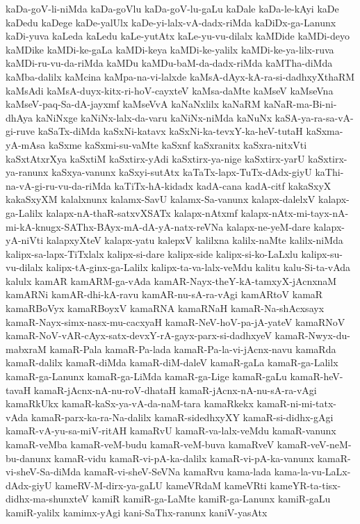 {kaDa-goV-li-niMda
kaDa-goVlu
kaDa-goV-lu-gaLu
kaDale
kaDa-le-kAyi
kaDe
kaDedu
kaDege
kaDe-yalUlx
kaDe-yi-lalx-vA-dadx-riMda
kaDiDx-ga-Lanunx
kaDi-yuva
kaLeda
kaLedu
kaLe-yutAtx
kaLe-yu-vu-dilalx
kaMDide
kaMDi-deyo
kaMDike
kaMDi-ke-gaLa
kaMDi-keya
kaMDi-ke-yalilx
kaMDi-ke-ya-lilx-ruva
kaMDi-ru-vu-da-riMda
kaMDu
kaMDu-baM-da-dadx-riMda
kaMTha-diMda
kaMba-dalilx
kaMcina
kaMpa-na-vi-lalxde
kaMsA-dAyx-kA-ra-si-dadhxyXthaRM
kaMsAdi
kaMsA-duyx-kitx-ri-hoV-cayxteV
kaMsa-daMte
kaMseV
kaMseVna
kaMseV-paq-Sa-dA-jayxmf
kaMseVvA
kaNaNxlilx
kaNaRM
kaNaR-ma-Bi-ni-dhAya
kaNiNxge
kaNiNx-lalx-da-varu
kaNiNx-niMda
kaNuNx
kaSA-ya-ra-sa-vA-gi-ruve
kaSaTx-diMda
kaSxNi-katavx
kaSxNi-ka-tevxY-ka-heV-tutaH
kaSxma-yA-mAsa
kaSxme
kaSxmi-su-vaMte
kaSxnf
kaSxranitx
kaSxra-nitxVti
kaSxtAtxrXya
kaSxtiM
kaSxtirx-yAdi
kaSxtirx-ya-nige
kaSxtirx-yarU
kaSxtirx-ya-ranunx
kaSxya-vanunx
kaSxyi-sutAtx
kaTaTx-lapx-TuTx-dAdx-giyU
kaThi-na-vA-gi-ru-vu-da-riMda
kaTiTx-hA-kidadx
kadA-cana
kadA-citf
kakaSxyX
kakaSxyXM
kalalxnunx
kalamx-SavU
kalamx-Sa-vanunx
kalapx-dalelxV
kalapx-ga-Lalilx
kalapx-nA-thaR-satxvXSATx
kalapx-nAtxmf
kalapx-nAtx-mi-tayx-nA-mi-kA-knugx-SAThx-BAyx-mA-dA-yA-natx-reVNa
kalapx-ne-yeM-dare
kalapx-yA-niVti
kalapxyXteV
kalapx-yatu
kalepxV
kalilxna
kalilx-naMte
kalilx-niMda
kalipx-sa-lapx-TiTxlalx
kalipx-si-dare
kalipx-side
kalipx-si-ko-LaLxlu
kalipx-su-vu-dilalx
kalipx-tA-ginx-ga-Lalilx
kalipx-ta-va-lalx-veMdu
kalitu
kalu-Si-ta-vAda
kalulx
kamAR
kamARM-ga-vAda
kamAR-Nayx-theY-kA-tamxyX-jAcnxnaM
kamARNi
kamAR-dhi-kA-ravu
kamAR-nu-sA-ra-vAgi
kamARtoV
kamaR
kamaRBoVyx
kamaRBoyxV
kamaRNA
kamaRNaH
kamaR-Na-shAcxsayx
kamaR-Nayx-simx-nasx-mu-cacxyaH
kamaR-NeV-hoV-pa-jA-yateV
kamaRNoV
kamaR-NoV-vAR-cAyx-satx-devxY-rA-gayx-parx-si-dadhxyeV
kamaR-Nwyx-du-mabxraM
kamaR-Pala
kamaR-Pa-lada
kamaR-Pa-la-vi-jAcnx-navu
kamaRda
kamaR-dalilx
kamaR-diMda
kamaR-diM-daleV
kamaR-gaLa
kamaR-ga-Lalilx
kamaR-ga-Lanunx
kamaR-ga-LiMda
kamaR-ga-Lige
kamaR-gaLu
kamaR-heV-tavaH
kamaR-jAcnx-nA-nu-roV-dhataH
kamaR-jAcnx-nA-nu-sA-ra-vAgi
kamaRkUkx
kamaR-kaSx-ya-vA-da-naM-tara
kamaRkekx
kamaR-ni-mi-tatx-vAda
kamaR-parx-ka-ra-Na-dalilx
kamaR-sidedhxyXY
kamaR-si-didhx-gAgi
kamaR-vA-yu-sa-miV-ritAH
kamaRvU
kamaR-va-lalx-veMdu
kamaR-vanunx
kamaR-veMba
kamaR-veM-budu
kamaR-veM-buva
kamaRveV
kamaR-veV-neM-bu-danunx
kamaR-vidu
kamaR-vi-pA-ka-dalilx
kamaR-vi-pA-ka-vanunx
kamaR-vi-sheV-Sa-diMda
kamaR-vi-sheV-SeVNa
kamaRvu
kama-lada
kama-la-vu-LaLx-dAdx-giyU
kameRV-M-dirx-ya-gaLU
kameVRdaM
kameVRti
kameYR-ta-tisx-didhx-ma-shunxteV
kamiR
kamiR-ga-LaMte
kamiR-ga-Lanunx
kamiR-gaLu
kamiR-yalilx
kamimx-yAgi
kani-SaThx-ranunx
kaniV-yasAtx
}
